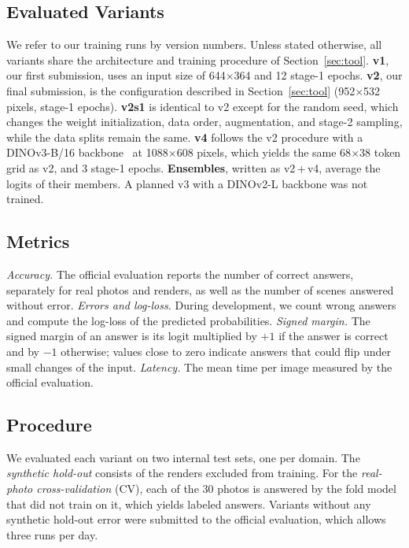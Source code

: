 \documentclass[10pt,conference]{IEEEtran}
\begin{document}
\subsection{Evaluated Variants}
We refer to our training runs by version numbers. Unless stated otherwise, all variants share the architecture and training procedure of Section~\ref{sec:tool}.
\textbf{v1}, our first submission, uses an input size of 644$\times$364 and 12 stage-1 epochs.
\textbf{v2}, our final submission, is the configuration described in Section~\ref{sec:tool} (952$\times$532 pixels, \sOneEpochs{} stage-1 epochs).
\textbf{v2s1} is identical to v2 except for the random seed, which changes the weight initialization, data order, augmentation, and stage-2 sampling, while the data splits remain the same.
\textbf{v4} follows the v2 procedure with a DINOv3-B/16 backbone~\cite{simeoni2025dinov3} at 1088$\times$608 pixels, which yields the same 68$\times$38 token grid as v2, and 3 stage-1 epochs.
\textbf{Ensembles}, written as v2\,+\,v4, average the logits of their members. A planned v3 with a DINOv2-L backbone was not trained.

\subsection{Metrics}
\emph{Accuracy.} The official evaluation reports the number of correct answers, separately for real photos and renders, as well as the number of scenes answered without error.
\emph{Errors and log-loss.} During development, we count wrong answers and compute the log-loss of the predicted probabilities.
\emph{Signed margin.} The signed margin of an answer is its logit multiplied by $+1$ if the answer is correct and by $-1$ otherwise; values close to zero indicate answers that could flip under small changes of the input.
\emph{Latency.} The mean time per image measured by the official evaluation.

\subsection{Procedure}
We evaluated each variant on two internal test sets, one per domain. The \emph{synthetic hold-out} consists of the \nHoldout{} renders excluded from training. For the \emph{real-photo cross-validation} (CV), each of the 30 photos is answered by the fold model that did not train on it, which yields \nCvAns{} labeled answers. Variants without any synthetic hold-out error were submitted to the official evaluation, which allows three runs per day.
\end{document}
